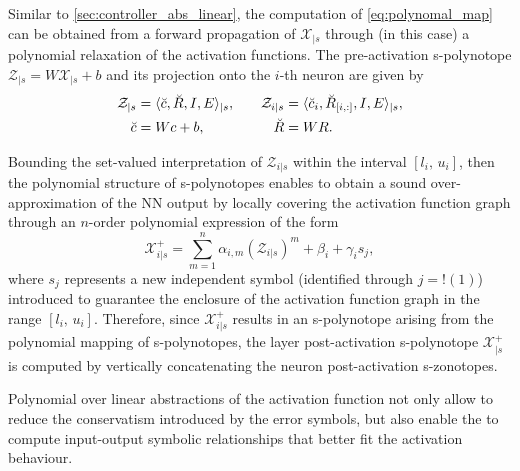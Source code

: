 \documentclass[journal]{IEEEtran}
\begin{document}
Similar to \cref{sec:controller_abs_linear}, the computation of \eqref{eq:polynomal_map} can be obtained from a forward propagation of $\mathcal{X}_{|s}$ through (in this case) a polynomial relaxation of the activation functions. The pre-activation s-polynotope $\mathcal{Z}_{|s} = W\mathcal{X}_{|s} +b$ and its projection onto the $i$-th neuron are given by
\begin{equation}
\begin{aligned}
           \mathcal{Z}_{|s} &= \langle \Breve{c},\Breve{R}, I,E \rangle_{|s}, \quad  &\mathcal{Z}_{i|s} &= \langle \Breve{c}_i,\Breve{R}_{[i,:]}, I,E \rangle_{|s}, \\
           \Breve{c} &= Wc+b, \quad &\Breve{R} &= WR.
\end{aligned}
\end{equation}

Bounding the set-valued interpretation of  $\mathcal{Z}_{i|s}$ within the interval $[l_i, \, u_i]$, then the polynomial structure of s-polynotopes enables to obtain a sound over-approximation of the NN output by locally covering the activation function graph through an $n$-order polynomial expression of the form
\begin{equation} \label{eq:n-pol}
    \mathcal{X}_{i|s}^{+} = \sum_{m=1}^n \alpha_{i,m}(\mathcal{Z}_{i|s})^m + \beta_i + \gamma_i s_j,
\end{equation}
\noindent where  $s_j$ represents a new independent symbol (identified through $j = !(1)$) introduced to guarantee the  enclosure of the activation function graph in the  range $[l_i, \, u_i] $. Therefore, since $ \mathcal{X}_{i|s}^{+}$ results in an s-polynotope arising from the polynomial mapping of s-polynotopes, the layer post-activation s-polynotope $ \mathcal{X}_{|s}^{+}$ is computed by vertically concatenating the neuron post-activation s-zonotopes.

Polynomial over linear abstractions of the activation function not only allow to reduce the conservatism introduced by the error symbols, but also enable the to compute input-output symbolic relationships that better fit the activation behaviour.
\end{document}
